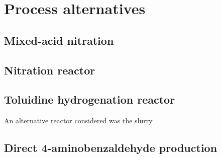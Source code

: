 \section{Process alternatives}
\label{app:alternatives}

\subsection{Mixed-acid nitration}
\label{mixed}

\subsection{Nitration reactor}
\label{nitrationreactor}
\subsubsection{}

\subsection{Toluidine hydrogenation reactor}
\label{toluidine}
An alternative reactor considered was the slurry


\subsection{Direct 4-aminobenzaldehyde production}
\label{direct}